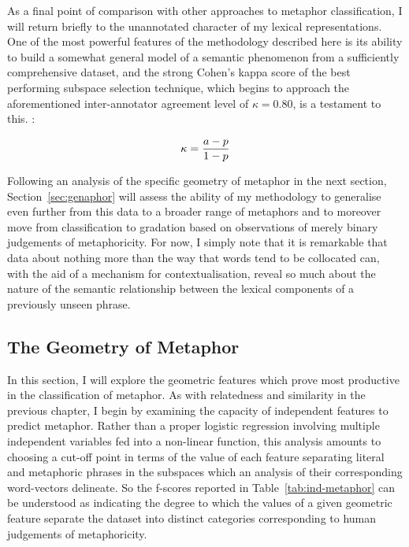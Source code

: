 As a final point of comparison with other approaches to metaphor classification, I will return briefly to the unannotated character of my lexical representations.  One of the most powerful features of the methodology described here is its ability to build a somewhat general model of a semantic phenomenon from a sufficiently comprehensive dataset, and the strong Cohen's kappa score of the best performing subspace selection technique, which begins to approach the aforementioned inter-annotator agreement level of $\kappa = 0.80$, is a testament to this.   \citep{Cohen1960}:

\begin{equation}
\revJB{33}{\kappa = \frac{a-p}{1-p}}
\end{equation}

\noindent{}  Following an analysis of the specific geometry of metaphor in the next section, Section~\ref{sec:genaphor} will assess the ability of my methodology to generalise even further from this data to a broader range of metaphors and to moreover move from classification to gradation based on observations of merely binary judgements of metaphoricity.  For now, I simply note that it is remarkable that data about nothing more than the way that words tend to be collocated can, with the aid of a mechanism for contextualisation, reveal so much about the nature of the semantic relationship between the lexical components of a previously unseen phrase.

\subsection{The Geometry of Metaphor}
In this section, I will explore the geometric features which prove most productive in the classification of metaphor.  As with relatedness and similarity in the previous chapter, I begin by examining the capacity of independent features to predict metaphor.  Rather than a proper logistic regression involving multiple independent variables fed into a non-linear function, this analysis amounts to choosing a cut-off point in terms of the value of each feature separating literal and metaphoric phrases in the subspaces which an analysis of their corresponding word-vectors delineate.  So the f-scores reported in Table~\ref{tab:ind-metaphor} can be understood as indicating the degree to which the values of a given geometric feature separate the dataset into distinct categories corresponding to human judgements of metaphoricity.

